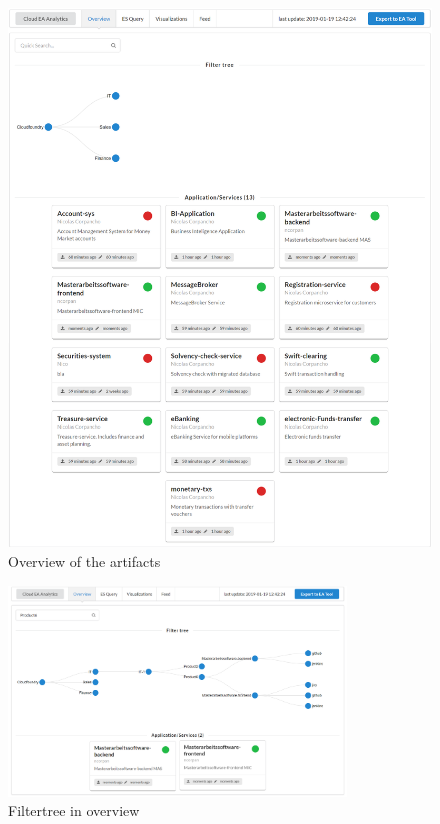 \begin{figure}[htpb]
  \centering
  \includegraphics[width=1.0\textwidth]{figures/pivio-overview.png}
  \caption{Overview of the artifacts}
  \label{fig:pivio-overview}
\end{figure}

\begin{figure}[htpb]
  \centering
  \includegraphics[width=0.8\textwidth]{figures/pivio-overview-filtertree.png}
  \caption{Filtertree in overview}
  \label{fig:pivio-overview-filtertree}
\end{figure}

